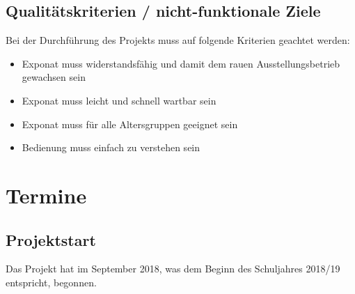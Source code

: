 \documentclass[a4paper]{scrartcl}
\begin{document}
\subsection{Qualitätskriterien / nicht-funktionale Ziele}
Bei der Durchführung des Projekts muss auf folgende Kriterien geachtet werden:
\begin{itemize}
\item Exponat muss widerstandsfähig und damit dem rauen Ausstellungsbetrieb gewachsen sein
\item Exponat muss leicht und schnell wartbar sein
\item Exponat muss für alle Altersgruppen geeignet sein
\item Bedienung muss einfach zu verstehen sein

\end{itemize}

\section{Termine}

\subsection{Projektstart}
Das Projekt hat im September 2018, was dem Beginn des Schuljahres 2018/19 entspricht, begonnen.
\end{document}
